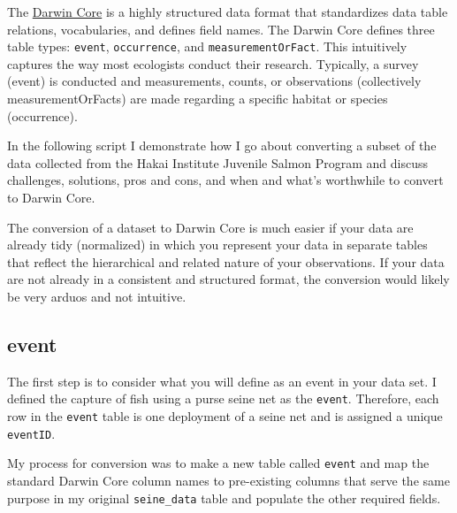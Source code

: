 \documentclass[
]{book}
\begin{document}
The \href{https://dwc.tdwg.org}{Darwin Core} is a highly structured data format that standardizes data table relations, vocabularies, and defines field names. The Darwin Core defines three table types: \texttt{event}, \texttt{occurrence}, and \texttt{measurementOrFact}. This intuitively captures the way most ecologists conduct their research. Typically, a survey (event) is conducted and measurements, counts, or observations (collectively measurementOrFacts) are made regarding a specific habitat or species (occurrence).

In the following script I demonstrate how I go about converting a subset of the data collected from the Hakai Institute Juvenile Salmon Program and discuss challenges, solutions, pros and cons, and when and what's worthwhile to convert to Darwin Core.

The conversion of a dataset to Darwin Core is much easier if your data are already tidy (normalized) in which you represent your data in separate tables that reflect the hierarchical and related nature of your observations. If your data are not already in a consistent and structured format, the conversion would likely be very arduos and not intuitive.

\hypertarget{event}{%
\subsection{event}\label{event}}

The first step is to consider what you will define as an event in your data set. I defined the capture of fish using a purse seine net as the \texttt{event}. Therefore, each row in the \texttt{event} table is one deployment of a seine net and is assigned a unique \texttt{eventID}.

My process for conversion was to make a new table called \texttt{event} and map the standard Darwin Core column names to pre-existing columns that serve the same purpose in my original \texttt{seine\_data} table and populate the other required fields.
\end{document}
